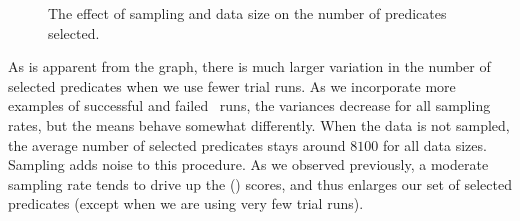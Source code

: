 \begin{figure}
  \hspace{\columnsep}
  \caption{The effect of sampling and data size on the number of
  predicates selected.}
\end{figure}

As is apparent from the graph, there is much larger variation in the
number of selected predicates when we use fewer trial runs.
As we incorporate more examples of successful and failed \moss\ runs,
the variances decrease for all sampling rates, but the means behave
somewhat differently.  When the data is not sampled, the average
number of selected predicates stays around $8100$ for all data sizes.
Sampling adds noise to this procedure.  As we observed previously,
a moderate sampling rate tends to drive up the \increase() scores, and
thus enlarges our set of selected predicates (except when we are using
very few trial runs).

